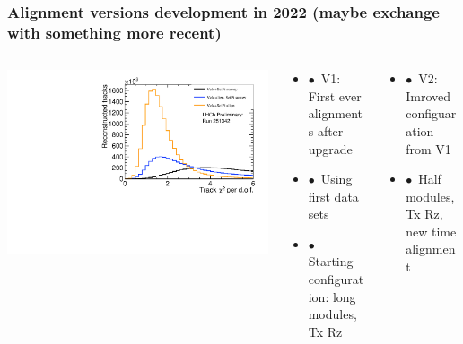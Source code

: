 \documentclass[aspectratio=1610, 12pt, xcolor=dvipsnames]{beamer}
\begin{document}
\begin{frame}\frametitle{Alignment versions development in 2022 (maybe exchange with something more recent)}
  \begin{columns}
    \begin{column}[c]{0.4\textwidth}
      \centering
      \includegraphics[width=\textwidth]{logos/LHCb-FIGURE-2022-018/Run251342Preliminary_BestLong_chi2_per_ndof.pdf}
    \end{column}
    \begin{column}[c]{0.3\textwidth}
      \begin{itemize}
        \item $\bullet$\, V1: First ever alignments after upgrade
      	\item $\bullet$\, Using first data sets
        \item $\bullet$\, Starting configuration: long modules, Tx Rz
      \end{itemize}
    \end{column}
    \begin{column}[c]{0.3\textwidth}
      \begin{itemize}
        \item $\bullet$\, V2: Imroved configuaration from V1 %
        \item $\bullet$\, Half modules, Tx Rz, new time alignment
      \end{itemize}
    \end{column}
  \end{columns}
\end{frame}
\end{document}
